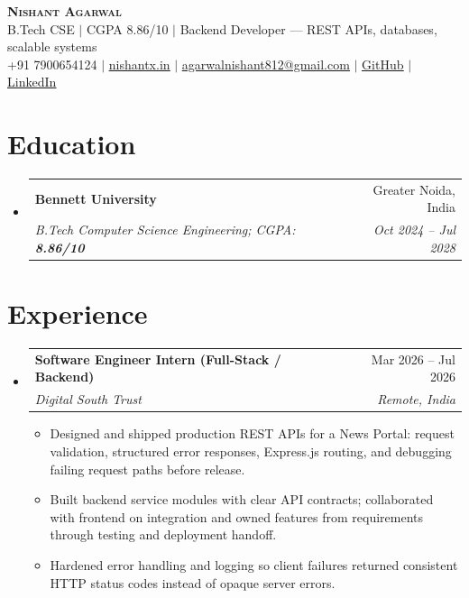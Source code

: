 \documentclass[letterpaper,11pt]{article}
\makeatletter
\newcommand{\resumeItem}[1]{
  \item\small{
    {#1 \vspace{-5pt}}
  }
}
\newcommand{\resumeSubheading}[4]{
  \vspace{-2pt}\item
    \begin{tabular*}{0.97\textwidth}[t]{l@{\extracolsep{\fill}}r}
      \textbf{#1} & #2 \\
      \textit{\small#3} & \textit{\small #4} \\
    \end{tabular*}\vspace{-9pt}
}
\newcommand{\resumeSubHeadingListStart}{\begin{itemize}[leftmargin=0.15in, label={}]}
\newcommand{\resumeSubHeadingListEnd}{\end{itemize}}
\newcommand{\resumeItemListStart}{\begin{itemize}}
\newcommand{\resumeItemListEnd}{\end{itemize}\vspace{-10pt}}
\makeatother
\begin{document}
\begin{center}
  \textbf{\Huge \scshape Nishant Agarwal} \\ \vspace{1pt}
  \small B.Tech CSE $|$ CGPA 8.86/10 $|$ Backend Developer --- REST APIs, databases, scalable systems \\ \vspace{1pt}
  \small +91 7900654124 $|$ \href{https://nishantx.in}{\underline{nishantx.in}} $|$ \href{mailto:agarwalnishant812@gmail.com}{\underline{agarwalnishant812@gmail.com}} $|$ \href{https://github.com/nishant-uxs}{\underline{GitHub}} $|$ \href{https://www.linkedin.com/in/nishant-agarwal-62a956322/}{\underline{LinkedIn}}
\end{center}

\section{Education}
  \resumeSubHeadingListStart
    \resumeSubheading
      {Bennett University}{Greater Noida, India}
      {B.Tech Computer Science Engineering; CGPA: \textbf{8.86/10}}{Oct 2024 -- Jul 2028}
  \resumeSubHeadingListEnd

\section{Experience}
  \resumeSubHeadingListStart
    \resumeSubheading
      {Software Engineer Intern (Full-Stack / Backend)}{Mar 2026 -- Jul 2026}
      {Digital South Trust}{Remote, India}
      \resumeItemListStart
        \resumeItem{Designed and shipped production REST APIs for a News Portal: request validation, structured error responses, Express.js routing, and debugging failing request paths before release.}
        \resumeItem{Built backend service modules with clear API contracts; collaborated with frontend on integration and owned features from requirements through testing and deployment handoff.}
        \resumeItem{Hardened error handling and logging so client failures returned consistent HTTP status codes instead of opaque server errors.}
      \resumeItemListEnd
  \resumeSubHeadingListEnd
\end{document}
